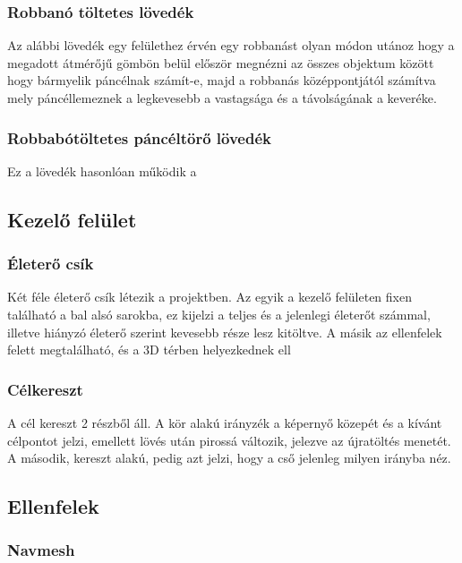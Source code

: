 \documentclass[
]{thesis-ekf}
\theoremstyle{definition}
\theoremstyle{remark}
\begin{document}
\subsubsection{Robbanó töltetes lövedék}

Az alábbi lövedék egy felülethez érvén egy robbanást olyan módon utánoz hogy a megadott átmérőjű gömbön belül először megnézni az összes objektum között hogy bármyelik páncélnak számít-e, majd a robbanás középpontjától számítva mely páncéllemeznek a legkevesebb a vastagsága és a távolságának a keveréke.

\subsubsection{Robbabótöltetes páncéltörő lövedék}

Ez a lövedék hasonlóan működik a

\subsection{Kezelő felület}

\subsubsection{Életerő csík}

Két féle életerő csík létezik a projektben. Az egyik a kezelő felületen fixen található a bal alsó sarokba, ez kijelzi a teljes és a jelenlegi életerőt számmal, illetve hiányzó életerő szerint kevesebb része lesz kitöltve. A másik az ellenfelek felett megtalálható, és a 3D térben helyezkednek ell

\subsubsection{Célkereszt}

A cél kereszt 2 részből áll. A kör alakú irányzék a képernyő közepét és a kívánt célpontot jelzi, emellett lövés után pirossá változik, jelezve az újratöltés menetét. A második, kereszt alakú, pedig azt jelzi, hogy a cső jelenleg milyen irányba néz.

\subsection{Ellenfelek}

\subsubsection{Navmesh}
\end{document}
